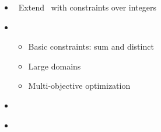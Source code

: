 \begin{frame}{\clingcon}
  \begin{itemize}
  \item {} \ Extend \clingo\ with constraints over integers
  \item {} \
    \begin{itemize}
    \item Basic constraints: sum and distinct
    \item Large domains
    \item Multi-objective optimization
    \end{itemize}
  \item {} \ \cite{bakaossc16a}
  \item {} \ \cite{?}
  \end{itemize}
\end{frame}
%
